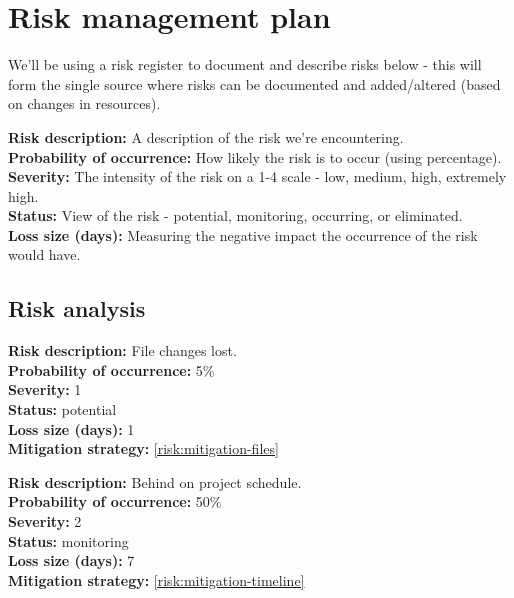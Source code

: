 \section{Risk management plan}
\label{sec:risk}
We'll be using a risk register to document and describe risks below - this will form the single source where
risks can be documented and added/altered (based on changes in resources).
\par
\textbf{Risk description:} A description of the risk we're encountering.\\
\textbf{Probability of occurrence:} How likely the risk is to occur (using percentage).\\
\textbf{Severity:} The intensity of the risk on a 1-4 scale - low, medium, high, extremely high.\\
\textbf{Status:} View of the risk - potential, monitoring, occurring, or eliminated.\\
\textbf{Loss size (days):} Measuring the negative impact the occurrence of the risk would have.\\

\subsection{Risk analysis}
\textbf{Risk description:} File changes lost.\\
\vspace{-2mm}
\textbf{Probability of occurrence:} 5\%\\
\vspace{-2mm}
\textbf{Severity:} 1\\
\vspace{-2mm}
\textbf{Status:} potential\\
\vspace{-2mm}
\textbf{Loss size (days):} 1\\
\textbf{Mitigation strategy:} \cref{risk:mitigation-files}\\

\par

\hrulefill

\textbf{Risk description:} Behind on project schedule.\\
\vspace{-2mm}
\textbf{Probability of occurrence:} 50\%\\
\vspace{-2mm}
\textbf{Severity:} 2\\
\vspace{-2mm}
\textbf{Status:} monitoring\\
\vspace{-2mm}
\textbf{Loss size (days):} 7\\
\textbf{Mitigation strategy:} \cref{risk:mitigation-timeline}\\

